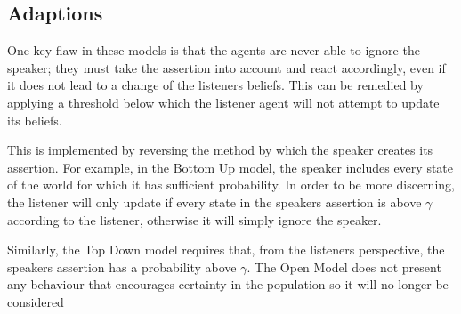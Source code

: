 \subsection{Adaptions}

One key flaw in these models is that the agents are never able to ignore the speaker; they must take the assertion into account and react accordingly, even if it does not lead to a change of the listeners beliefs. This can be remedied by applying a threshold below which the listener agent will not attempt to update its beliefs. 

This is implemented by reversing the method by which the speaker creates its assertion. For example, in the Bottom Up model, the speaker includes every state of the world for which it has sufficient probability. In order to be more discerning, the listener will only update if every state in the speakers assertion is above $\gamma$ according to the listener, otherwise it will simply ignore the speaker. 

Similarly, the Top Down model requires that, from the listeners perspective, the speakers assertion has a probability above $\gamma$. The Open Model does not present any behaviour that encourages certainty in the population so it will no longer be considered



